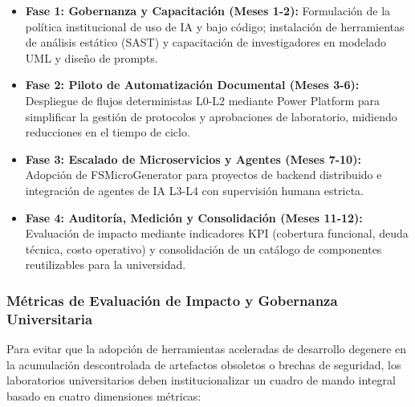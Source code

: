 \begin{itemize}
    \item \textbf{Fase 1: Gobernanza y Capacitación (Meses 1-2):} Formulación de la política institucional de uso de IA y bajo código; instalación de herramientas de análisis estático (SAST) y capacitación de investigadores en modelado UML y diseño de prompts.
    \item \textbf{Fase 2: Piloto de Automatización Documental (Meses 3-6):} Despliegue de flujos deterministas L0-L2 mediante Power Platform para simplificar la gestión de protocolos y aprobaciones de laboratorio, midiendo reducciones en el tiempo de ciclo.
    \item \textbf{Fase 3: Escalado de Microservicios y Agentes (Meses 7-10):} Adopción de FSMicroGenerator para proyectos de backend distribuido e integración de agentes de IA L3-L4 con supervisión humana estricta.
    \item \textbf{Fase 4: Auditoría, Medición y Consolidación (Meses 11-12):} Evaluación de impacto mediante indicadores KPI (cobertura funcional, deuda técnica, costo operativo) y consolidación de un catálogo de componentes reutilizables para la universidad.
\end{itemize}

\subsubsection{Métricas de Evaluación de Impacto y Gobernanza Universitaria}

Para evitar que la adopción de herramientas aceleradas de desarrollo degenere en la acumulación descontrolada de artefactos obsoletos o brechas de seguridad, los laboratorios universitarios deben institucionalizar un cuadro de mando integral basado en cuatro dimensiones métricas:

